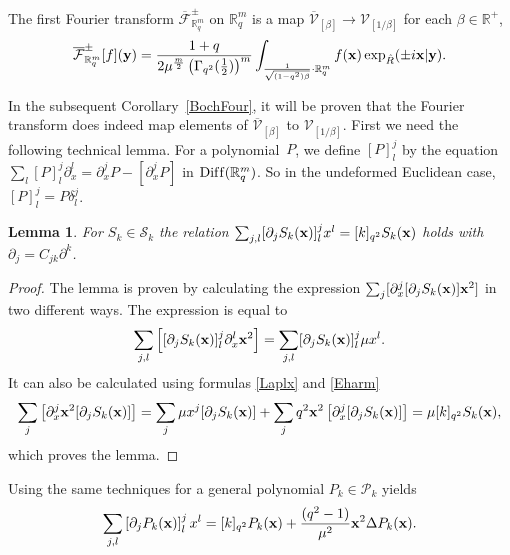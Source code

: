 \documentclass[11pt]{article}
\newtheorem{lemma}{Lemma}
\newcommand{\mR}{\mathbb{R}}
\newcommand{\cF}{\mathcal{F}}
\newcommand{\cP}{\mathcal{P}}
\newcommand{\cS}{\mathcal{S}}
\newcommand{\cV}{\mathcal{V}}
\numberwithin{equation}{section}
\begin{document}
\begin{definition}
\label{defFour1}
The f\/irst Fourier transform $\overline{\cF}^{\pm}_{\mR^m_q}$ on $\mR^m_q$ is a map $\overline{\cV}_{[\beta]}\to\cV_{[1/\beta]}$ for each $\beta\in\mR^+$,
\begin{gather*}
\overline{\cF}^\pm_{\mR^m_q}[f](\bold{y}) = \frac{1+q}{2\mu^{\frac{m}{2}}\left(\Gamma_{q^2}(\frac{1}{2})\right)^{m}}\int_{\frac{1}{\sqrt{(1-q^2)\beta}}\cdot\mR^m_q}f(\bold{x})\exp_{\hat{R}}(\pm i\bold{x}|\bold{y}).
\end{gather*}
\end{definition}
In the subsequent Corollary~\ref{BochFour}, it will be proven that the Fourier transform does indeed map elements of $\overline{\cV}_{[\beta]}$ to $\cV_{[1/\beta]}$. First we need the following technical lemma. For a polynomial~$P$, we def\/ine $[P]^j_l$ by the equation $\sum_l [P]^j_l\partial_x^l=\partial_x^j P-\left[\partial^j_xP\right]$ in ${\rm Dif\/f}(\mR^m_q)$. So in the undeformed Euclidean case, $[P]^j_l=P\delta_l^j$.
\begin{lemma}\label{Svrexp}
For $S_k\in\cS_k$ the relation $\sum_{j,l}[\partial_jS_k(\bold{x})]^j_lx^l=[k]_{q^2}S_k(\bold{x})$ holds with $\partial_j=C_{jk}\partial^k$.
\end{lemma}

\begin{proof}
The lemma is proven by calculating the expression $\sum_j [\partial_x^j[\partial_jS_k(\bold{x})]\bold{x}^2 ]$ in two dif\/ferent ways. The expression is equal to
\begin{gather*}
\sum_{j,l}\left[[\partial_jS_k(\bold{x})]^j_l\partial_x^l\bold{x}^2\right] = \sum_{j,l}[\partial_jS_k(\bold{x})]^j_l\mu x^l.
\end{gather*}
It can also be calculated using formulas \eqref{Laplx} and \eqref{Eharm}
\begin{gather*}
\sum_j\left[\partial_x^j\bold{x}^2[\partial_jS_k(\bold{x})]\right] = \sum_j\mu x^j[\partial_jS_k(\bold{x})]+\sum_jq^2\bold{x}^2\left[\partial_x^j[\partial_jS_k(\bold{x})]\right]=\mu [k]_{q^2}S_k(\bold{x}),
\end{gather*}
which proves the lemma.
\end{proof}

\begin{remark}
Using the same techniques for a general polynomial $P_k\in\cP_k$ yields
\begin{gather*}
\sum_{j,l}\left[\partial_j P_k(\bold{x})\right]^j_lx^l=[k]_{q^2}P_k(\bold{x})+\frac{(q^2-1)}{\mu^2}\bold{x}^2\Delta P_k(\bold{x}).
\end{gather*}
\end{remark}
\end{document}
